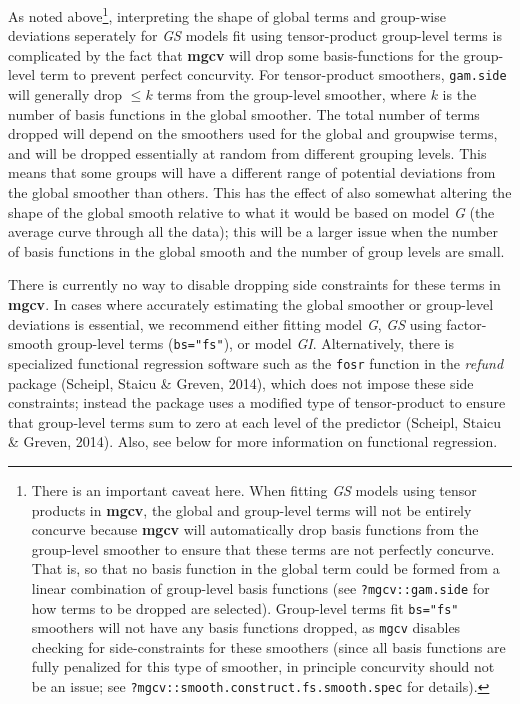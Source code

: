\documentclass[12pt]{article}
\let\rmarkdownfootnote\footnote%
\def\footnote{\protect\rmarkdownfootnote}
\begin{document}
As noted above\footnote{There is an important caveat here. When fitting
  \emph{GS} models using tensor products in \textbf{mgcv}, the global
  and group-level terms will not be entirely concurve because
  \textbf{mgcv} will automatically drop basis functions from the
  group-level smoother to ensure that these terms are not perfectly
  concurve. That is, so that no basis function in the global term could
  be formed from a linear combination of group-level basis functions
  (see \texttt{?mgcv::gam.side} for how terms to be dropped are
  selected). Group-level terms fit \texttt{bs="fs"} smoothers will not
  have any basis functions dropped, as \texttt{mgcv} disables checking
  for side-constraints for these smoothers (since all basis functions
  are fully penalized for this type of smoother, in principle concurvity
  should not be an issue; see
  \texttt{?mgcv::smooth.construct.fs.smooth.spec} for details).},
interpreting the shape of global terms and group-wise deviations
seperately for \emph{GS} models fit using tensor-product group-level
terms is complicated by the fact that \textbf{mgcv} will drop some
basis-functions for the group-level term to prevent perfect concurvity.
For tensor-product smoothers, \texttt{gam.side} will generally drop
\(\le k\) terms from the group-level smoother, where \(k\) is the number
of basis functions in the global smoother. The total number of terms
dropped will depend on the smoothers used for the global and groupwise
terms, and will be dropped essentially at random from different grouping
levels. This means that some groups will have a different range of
potential deviations from the global smoother than others. This has the
effect of also somewhat altering the shape of the global smooth relative
to what it would be based on model \emph{G} (the average curve through
all the data); this will be a larger issue when the number of basis
functions in the global smooth and the number of group levels are small.

There is currently no way to disable dropping side constraints for these
terms in \textbf{mgcv}. In cases where accurately estimating the global
smoother or group-level deviations is essential, we recommend either
fitting model \emph{G}, \emph{GS} using factor-smooth group-level terms
(\texttt{bs="fs"}), or model \emph{GI}. Alternatively, there is
specialized functional regression software such as the \texttt{fosr}
function in the \emph{refund} package (Scheipl, Staicu \& Greven, 2014),
which does not impose these side constraints; instead the package uses a
modified type of tensor-product to ensure that group-level terms sum to
zero at each level of the predictor (Scheipl, Staicu \& Greven, 2014).
Also, see below for more information on functional regression.
\end{document}
